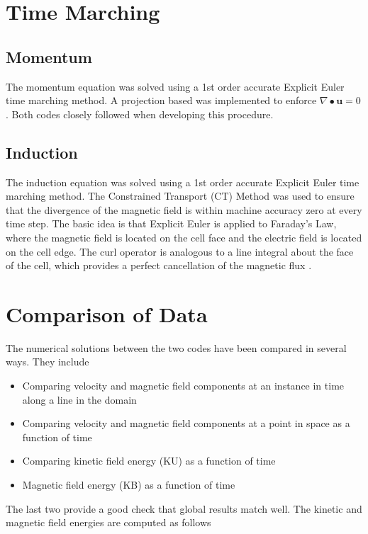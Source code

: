 \documentclass[11pt]{article}
\begin{document}
\section{Time Marching}
\subsection{Momentum}
The momentum equation was solved using a 1st order accurate Explicit Euler time marching method. A projection based was implemented to enforce $\nabla \bullet \pmb{u} = 0$. Both codes closely followed \cite{griebel1997numerical} when developing this procedure.

\subsection{Induction}
The induction equation was solved using a 1st order accurate Explicit Euler time marching method. The Constrained Transport (CT) Method was used to ensure that the divergence of the magnetic field is within machine accuracy zero at every time step. The basic idea is that Explicit Euler is applied to Faraday's Law, where the magnetic field is located on the cell face and the electric field is located on the cell edge. The curl operator is analogous to a line integral about the face of the cell, which provides a perfect cancellation of the magnetic flux \cite{Toth2000}.

\section{Comparison of Data}

The numerical solutions between the two codes have been compared in several ways. They include 

\begin{itemize}
\item Comparing velocity and magnetic field components at an instance in time along a line in the domain
\item Comparing velocity and magnetic field components at a point in space as a function of time
\item Comparing kinetic field energy (KU) as a function of time
\item Magnetic field energy (KB) as a function of time
\end{itemize}

The last two provide a good check that global results match well. The kinetic and magnetic field energies are computed as follows
\end{document}
